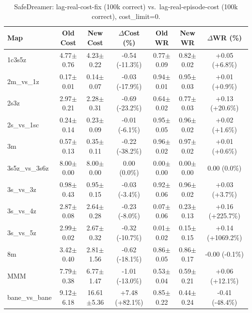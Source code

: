 \documentclass{article}
\begin{document}
\begin{table}[h]
\centering
\caption{SafeDreamer: lag-real-cost-fix (100k correct) vs.\ lag-real-episode-cost (100k correct), cost\_limit=0.}
\begin{tabular}{lcccccc}
\toprule
\textbf{Map} & \textbf{Old Cost} & \textbf{New Cost} & \textbf{$\Delta$Cost (\%)} & \textbf{Old WR} & \textbf{New WR} & \textbf{$\Delta$WR (\%)} \\
\midrule
1c3s5z & 4.77$\pm$0.76 & 4.23$\pm$0.22 & \textcolor{green!55!black}{-0.54 (-11.3\%)} & 0.77$\pm$0.09 & 0.82$\pm$0.02 & \textcolor{green!55!black}{+0.05 (+6.8\%)} \\
2m\_vs\_1z & 0.17$\pm$0.01 & 0.14$\pm$0.07 & \textcolor{green!70!black}{-0.03 (-17.9\%)} & 0.94$\pm$0.01 & 0.95$\pm$0.03 & \textcolor{green!40!black}{+0.01 (+0.9\%)} \\
2s3z & 2.97$\pm$0.21 & 2.28$\pm$0.31 & \textcolor{green!70!black}{-0.69 (-23.2\%)} & 0.64$\pm$0.02 & 0.77$\pm$0.03 & \textcolor{green!70!black}{+0.13 (+20.6\%)} \\
2s\_vs\_1sc & 0.24$\pm$0.14 & 0.23$\pm$0.09 & \textcolor{green!55!black}{-0.01 (-6.1\%)} & 0.95$\pm$0.05 & 0.96$\pm$0.02 & \textcolor{green!40!black}{+0.02 (+1.6\%)} \\
3m & 0.57$\pm$0.13 & 0.35$\pm$0.11 & \textcolor{green!85!black}{-0.22 (-38.2\%)} & 0.96$\pm$0.02 & 0.97$\pm$0.02 & \textcolor{green!40!black}{+0.01 (+0.6\%)} \\
3s5z\_vs\_3s6z & 8.00$\pm$0.00 & 8.00$\pm$0.00 & \textcolor{green!40!black}{0.00 (0.0\%)} & 0.00$\pm$0.00 & 0.00$\pm$0.00 & \textcolor{red!40!black}{0.00 (0.0\%)} \\
3s\_vs\_3z & 0.98$\pm$0.43 & 0.95$\pm$0.15 & \textcolor{green!40!black}{-0.03 (-3.4\%)} & 0.92$\pm$0.06 & 0.96$\pm$0.02 & \textcolor{green!40!black}{+0.03 (+3.7\%)} \\
3s\_vs\_4z & 2.87$\pm$0.08 & 2.64$\pm$0.28 & \textcolor{green!55!black}{-0.23 (-8.0\%)} & 0.07$\pm$0.06 & 0.23$\pm$0.13 & \textcolor{green!100!black}{+0.16 (+225.7\%)} \\
3s\_vs\_5z & 2.99$\pm$0.02 & 2.67$\pm$0.32 & \textcolor{green!55!black}{-0.32 (-10.7\%)} & 0.01$\pm$0.02 & 0.15$\pm$0.15 & \textcolor{green!100!black}{+0.14 (+1069.2\%)} \\
8m & 3.42$\pm$0.40 & 2.81$\pm$1.56 & \textcolor{green!70!black}{-0.62 (-18.1\%)} & 0.86$\pm$0.05 & 0.86$\pm$0.17 & \textcolor{red!40!black}{-0.00 (-0.1\%)} \\
MMM & 7.79$\pm$0.38 & 6.77$\pm$1.47 & \textcolor{green!55!black}{-1.01 (-13.0\%)} & 0.53$\pm$0.04 & 0.59$\pm$0.21 & \textcolor{green!55!black}{+0.06 (+12.1\%)} \\
bane\_vs\_bane & 9.12$\pm$6.18 & 16.61$\pm$5.36 & \textcolor{red!100!black}{+7.48 (+82.1\%)} & 0.85$\pm$0.22 & 0.44$\pm$0.24 & \textcolor{red!85!black}{-0.41 (-48.4\%)} \\
\bottomrule
\end{tabular}
\end{table}
\end{document}
